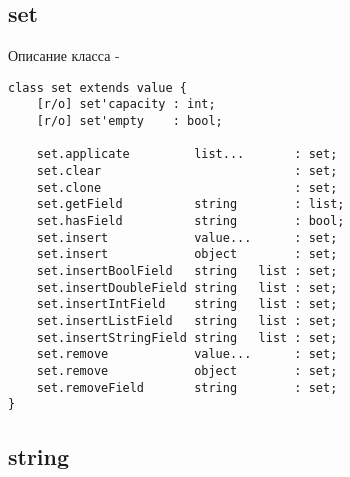\subsection{{\color{lightblue} set}}

\noindent Описание класса \set -
\begin{lstlisting}[numbers=none]
class set extends value {
    [r/o] set'capacity : int;
    [r/o] set'empty    : bool;

    set.applicate         list...       : set;
    set.clear                           : set;
    set.clone                           : set;
    set.getField          string        : list;
    set.hasField          string        : bool;
    set.insert            value...      : set;
    set.insert            object        : set;
    set.insertBoolField   string   list : set;
    set.insertDoubleField string   list : set;
    set.insertIntField    string   list : set;
    set.insertListField   string   list : set;
    set.insertStringField string   list : set;
    set.remove            value...      : set;
    set.remove            object        : set;
    set.removeField       string        : set;
}
\end{lstlisting}

\subsection{{\color{lightblue} string}}

